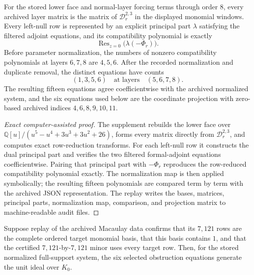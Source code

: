 \begin{proposition}
\label{prop:terminal-residue-provenance}
For the stored lower face and normal-layer forcing terms through order
\(8\), every archived layer matrix is the matrix of
\(\mathscr D_r^{2,3}\) in the displayed monomial windows.  Every left-null
row is represented by an explicit principal part \(\lambda\) satisfying the
filtered adjoint equations, and its compatibility polynomial is exactly
\[
\operatorname{Res}_{z=0}\bigl(\lambda(-\Phi_r)\bigr).
\]
Before parameter normalization, the numbers of nonzero compatibility
polynomials at layers \(6,7,8\) are \(4,5,6\).  After the recorded
normalization and duplicate removal, the distinct equations have counts
\[
(1,3,5,6)\quad\text{at layers}\quad(5,6,7,8).
\]
The resulting fifteen equations agree coefficientwise with the archived
normalized system, and the six equations used below are the coordinate
projection with zero-based archived indices \(4,6,8,9,10,11\).
\end{proposition}

\begin{proof}[Exact computer-assisted proof]
The supplement rebuilds the lower face over
\(\mathbb Q[u]/(u^5-u^4+3u^3+3u^2+26)\), forms every matrix directly from
\(\mathscr D_r^{2,3}\), and computes exact row-reduction transforms.
For each left-null row it constructs the dual principal part and verifies
the two filtered formal-adjoint equations coefficientwise.  Pairing that
principal part with \(-\Phi_r\) reproduces the row-reduced compatibility
polynomial exactly.  The normalization map is then applied symbolically;
the resulting fifteen polynomials are compared term by term with the
archived JSON representation.  The replay writes the bases, matrices,
principal parts, normalization map, comparison, and projection matrix to
machine-readable audit files.
\end{proof}

\begin{theorem}
\label{thm:terminal-unit}
Suppose replay of the archived Macaulay data confirms that its \(7{,}121\)
rows are the complete ordered target monomial basis, that this basis contains
\(1\), and that the certified \(7{,}121\)-by-\(7{,}121\) minor uses every
target row.  Then, for the stored normalized full-support system, the six
selected obstruction equations generate the unit ideal over \(K_0\).
\end{theorem}


